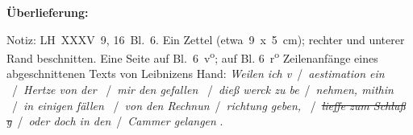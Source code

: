 %  
%
%
%
%
%   
%
%
%
%
%
%
%
\frenchspacing
%
\begin{ledgroupsized}[r]{120mm}
\footnotesize
\pstart
\noindent\textbf{Überlieferung:}
\pend
\end{ledgroupsized}
%
\begin{ledgroupsized}[r]{114mm}
\footnotesize
\pstart \parindent -6mm
%
Notiz:
LH~XXXV~9, 16~Bl.~6. 
Ein Zettel (etwa~9~x~5~cm);
rechter und unterer Rand beschnitten.
Eine Seite auf Bl.~6~v\textsuperscript{o};
auf Bl. 6~r\textsuperscript{o} Zeilenanfänge eines abgeschnittenen Texts von Leibnizens Hand:
\textit{Weilen ich v}\textlangle\textendash\textrangle\ \lbrack/\rbrack\ 
\textit{aestimation ein} \textlangle\textendash\textrangle\ \lbrack/\rbrack\ 
\textit{Hertze von der} \textlangle\textendash\textrangle\ \lbrack/\rbrack\ 
\textit{mir den gefallen} \textlangle\textendash\textrangle\ \lbrack/\rbrack\ 
\textit{dieß werck zu be}\textlangle\textendash\textrangle\ \lbrack/\rbrack\ 
\textit{nehmen, mithin} \textlangle\textendash\textrangle\ \lbrack/\rbrack\ 
\textit{in einigen fällen} \textlangle\textendash\textrangle\ \lbrack/\rbrack\ 
\textit{von den Rechnun}\textlangle\textendash\textrangle\ \lbrack/\rbrack\ 
\textit{richtung geben,} \textlangle\textendash\textrangle\ \lbrack/\rbrack\ 
\sout{\textit{lieffe zum Schluß g}}\textlangle\textendash\textrangle\ \lbrack/\rbrack\ 
\textit{oder doch in den}\textlangle\textendash\textrangle\ \lbrack/\rbrack\ 
\textit{Cammer gelangen} \textlangle\textendash\textrangle.
\pend
\end{ledgroupsized}
%
%
\vspace{5mm}
